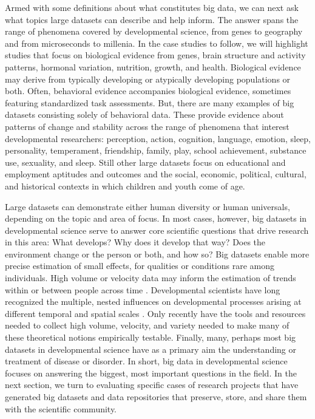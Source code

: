 \documentclass[letterpaper,man,apacite]{apa6}
\begin{document}
Armed with some definitions about what constitutes big data, we can next ask what topics large datasets can describe and help inform.
The answer spans the range of phenomena covered by developmental science, from genes to geography and from microseconds to millenia.
In the case studies to follow, we will highlight studies that focus on biological evidence from genes, brain structure and activity patterns, hormonal variation, nutrition, growth, and health.
Biological evidence may derive from typically developing or atypically developing populations or both.
Often, behavioral evidence accompanies biological evidence, sometimes featuring standardized task assessments.
But, there are many examples of big datasets consisting solely of behavioral data.
These provide evidence about patterns of change and stability across the range of phenomena that interest developmental researchers: perception, action, cognition, language, emotion, sleep, personality, temperament, friendship, family, play, school achievement, substance use, sexuality, and sleep.
Still other large datasets focus on educational and employment aptitudes and outcomes and the social, economic, political, cultural, and historical contexts in which children and youth come of age.

Large datasets can demonstrate either human diversity or human universals, depending on the topic and area of focus.
In most cases, however, big datasets in developmental science serve to answer core scientific questions that drive research in this area: What develops? 
Why does it develop that way? 
Does the environment change or the person or both, and how so?
Big datasets enable more precise estimation of small effects, for qualities or conditions rare among individuals.
High volume or velocity data may inform the estimation of trends within or between people across time \cite{rietveld_replicability_2014}.
Developmental scientists have long recognized the multiple, nested influences on developmental processes arising at different temporal and spatial scales \cite{elman_rethinking_1998, gottlieb_normally_1998, oyama_ontogeny_2000, vygotsky_mind_1980}.
Only recently have the tools and resources needed to collect high volume, velocity, and variety needed to make many of these theoretical notions empirically testable.
Finally, many, perhaps most big datasets in developmental science have as a primary aim the understanding or treatment of disease or disorder.
In short, big data in developmental science focuses on answering the biggest, most important questions in the field.
In the next section, we turn to evaluating specific cases of research projects that have generated big datasets and data repositories that preserve, store, and share them with the scientific community.
\end{document}
